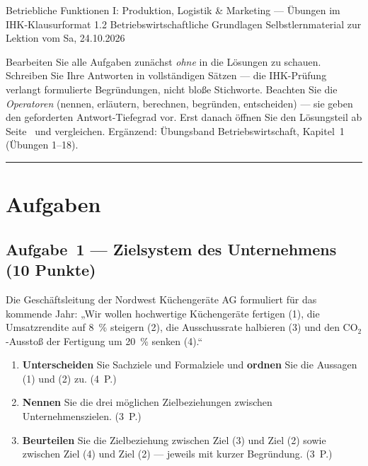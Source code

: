 \documentclass[11pt, a4paper]{article}
\begin{document}
%
  {Betriebliche Funktionen I: Produktion, Logistik \& Marketing --- Übungen im IHK-Klausurformat}%
  {1.2 Betriebswirtschaftliche Grundlagen}%
  {Selbstlernmaterial zur Lektion vom Sa, 24.10.2026}


\begin{merksatz}[title={\bfseries So nutzen Sie dieses Aufgabenheft}]
Bearbeiten Sie alle Aufgaben zunächst \emph{ohne} in die Lösungen zu schauen. Schreiben
Sie Ihre Antworten in vollständigen Sätzen --- die IHK-Prüfung verlangt formulierte
Begründungen, nicht bloße Stichworte. Beachten Sie die \emph{Operatoren} (nennen,
erläutern, berechnen, begründen, entscheiden) --- sie geben den geforderten
Antwort-Tiefegrad vor. Erst danach öffnen Sie den Lösungsteil ab
Seite~\pageref{loesungen} und vergleichen. Ergänzend: Übungsband Betriebswirtschaft,
Kapitel~1 (Übungen 1--18).
\end{merksatz}

\tableofcontents
\vspace{1em}
\hrule

\section{Aufgaben}

\subsection*{Aufgabe~1 --- Zielsystem des Unternehmens (10 Punkte)}

Die Geschäftsleitung der Nordwest Küchengeräte AG formuliert für das kommende Jahr:
„Wir wollen hochwertige Küchengeräte fertigen (1), die Umsatzrendite auf 8~\% steigern
(2), die Ausschussrate halbieren (3) und den CO$_2$-Ausstoß der Fertigung um 20~\%
senken (4).``

\begin{enumerate}[label=(\alph*)]
  \item \textbf{Unterscheiden} Sie Sachziele und Formalziele und \textbf{ordnen} Sie die Aussagen (1) und (2) zu. \hfill (4~P.)
  \item \textbf{Nennen} Sie die drei möglichen Zielbeziehungen zwischen Unternehmenszielen. \hfill (3~P.)
  \item \textbf{Beurteilen} Sie die Zielbeziehung zwischen Ziel (3) und Ziel (2) sowie zwischen Ziel (4) und Ziel (2) --- jeweils mit kurzer Begründung. \hfill (3~P.)
\end{enumerate}
\end{document}
